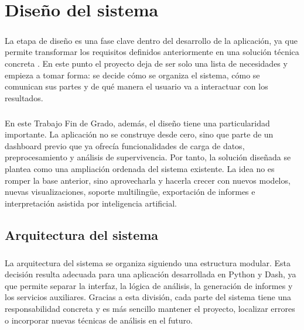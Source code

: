 \chapter{Diseño del sistema}
\label{ch:diseno}

\paragraph*{}
La etapa de diseño es una fase clave dentro del desarrollo de la aplicación, ya que permite transformar los requisitos definidos anteriormente en una solución técnica concreta \cite{pressman2015}. En este punto el proyecto deja de ser solo una lista de necesidades y empieza a tomar forma: se decide cómo se organiza el sistema, cómo se comunican sus partes y de qué manera el usuario va a interactuar con los resultados.

\paragraph*{}
En este Trabajo Fin de Grado, además, el diseño tiene una particularidad importante. La aplicación no se construye desde cero, sino que parte de un dashboard previo que ya ofrecía funcionalidades de carga de datos, preprocesamiento y análisis de supervivencia. Por tanto, la solución diseñada se plantea como una ampliación ordenada del sistema existente. La idea no es romper la base anterior, sino aprovecharla y hacerla crecer con nuevos modelos, nuevas visualizaciones, soporte multilingüe, exportación de informes e interpretación asistida por inteligencia artificial.

\section{Arquitectura del sistema}

\paragraph*{}
La arquitectura del sistema se organiza siguiendo una estructura modular. Esta decisión resulta adecuada para una aplicación desarrollada en Python y Dash, ya que permite separar la interfaz, la lógica de análisis, la generación de informes y los servicios auxiliares. Gracias a esta división, cada parte del sistema tiene una responsabilidad concreta y es más sencillo mantener el proyecto, localizar errores o incorporar nuevas técnicas de análisis en el futuro.

